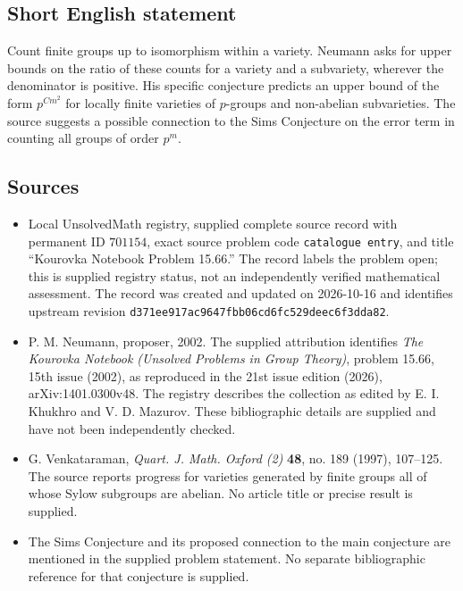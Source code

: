 \documentclass[11pt]{article}
\begin{document}
\subsection{Short English statement}
Count finite groups up to isomorphism within a variety. Neumann asks for upper bounds on the ratio of these counts for a variety and a subvariety, wherever the denominator is positive. His specific conjecture predicts an upper bound of the form \(p^{Cm^2}\) for locally finite varieties of \(p\)-groups and non-abelian subvarieties. The source suggests a possible connection to the Sims Conjecture on the error term in counting all groups of order \(p^m\).
\subsection{Sources}
\begin{itemize}
\item Local UnsolvedMath registry, supplied complete source record with permanent ID \(701154\), exact source problem code \texttt{catalogue entry}, and title ``Kourovka Notebook Problem 15.66.'' The record labels the problem open; this is supplied registry status, not an independently verified mathematical assessment. The record was created and updated on 2026-10-16 and identifies upstream revision \texttt{d371ee917ac9647fbb06cd6fc529deec6f3dda82}.
\item P. M. Neumann, proposer, 2002. The supplied attribution identifies \emph{The Kourovka Notebook (Unsolved Problems in Group Theory)}, problem 15.66, 15th issue (2002), as reproduced in the 21st issue edition (2026), arXiv:1401.0300v48. The registry describes the collection as edited by E. I. Khukhro and V. D. Mazurov. These bibliographic details are supplied and have not been independently checked.
\item G. Venkataraman, \emph{Quart. J. Math. Oxford (2)} \textbf{48}, no. 189 (1997), 107--125. The source reports progress for varieties generated by finite groups all of whose Sylow subgroups are abelian. No article title or precise result is supplied.
\item The Sims Conjecture and its proposed connection to the main conjecture are mentioned in the supplied problem statement. No separate bibliographic reference for that conjecture is supplied.
\end{itemize}
\end{document}
